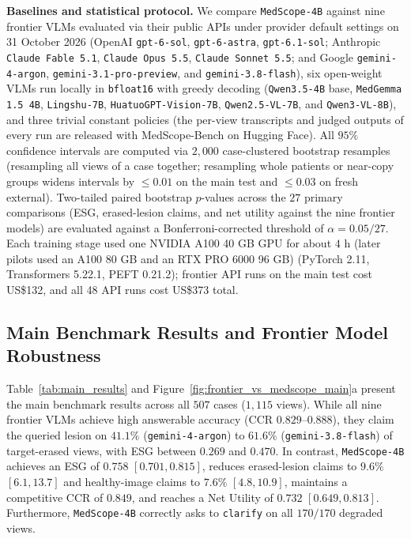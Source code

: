 \documentclass[5p,times,twocolumn,authoryear]{elsarticle}
\begin{document}
\textbf{Baselines and statistical protocol.} We compare \texttt{MedScope-4B} against nine frontier VLMs evaluated via their public APIs under provider default settings on 31 October 2026 (OpenAI \texttt{gpt-6-sol}, \texttt{gpt-6-astra}, \texttt{gpt-6.1-sol}; Anthropic \texttt{Claude Fable 5.1}, \texttt{Claude Opus 5.5}, \texttt{Claude Sonnet 5.5}; and Google \texttt{gemini-4-argon}, \texttt{gemini-3.1-pro-preview}, and \texttt{gemini-3.8-flash}), six open-weight VLMs run locally in \texttt{bfloat16} with greedy decoding (\texttt{Qwen3.5-4B} base, \texttt{MedGemma 1.5 4B}, \texttt{Lingshu-7B}, \texttt{HuatuoGPT-Vision-7B}, \texttt{Qwen2.5-VL-7B}, and \texttt{Qwen3-VL-8B}), and three trivial constant policies (the per-view transcripts and judged outputs of every run are released with MedScope-Bench on Hugging Face). All $95\%$ confidence intervals are computed via $2,000$ case-clustered bootstrap resamples (resampling all views of a case together; resampling whole patients or near-copy groups widens intervals by $\le 0.01$ on the main test and $\le 0.03$ on fresh external). Two-tailed paired bootstrap $p$-values across the $27$ primary comparisons (ESG, erased-lesion claims, and net utility against the nine frontier models) are evaluated against a Bonferroni-corrected threshold of $\alpha = 0.05/27$. Each training stage used one NVIDIA A100 40 GB GPU for about $4\text{ h}$ (later pilots used an A100 80 GB and an RTX PRO 6000 96 GB) (PyTorch 2.11, Transformers 5.22.1, PEFT 0.21.2); frontier API runs on the main test cost US\$132, and all 48 API runs cost US\$373 total.

\subsection{Main Benchmark Results and Frontier Model Robustness}
\label{subsec:exp_main}
Table~\ref{tab:main_results} and Figure~\ref{fig:frontier_vs_medscope_main}a present the main benchmark results across all $507$ cases ($1,115$ views). While all nine frontier VLMs achieve high answerable accuracy ($\text{CCR } 0.829\text{--}0.888$), they claim the queried lesion on $41.1\%$ (\texttt{gemini-4-argon}) to $61.6\%$ (\texttt{gemini-3.8-flash}) of target-erased views, with ESG between $0.269$ and $0.470$. In contrast, \texttt{MedScope-4B} achieves an ESG of $0.758$ $[0.701, 0.815]$, reduces erased-lesion claims to $9.6\%$ $[6.1, 13.7]$ and healthy-image claims to $7.6\%$ $[4.8, 10.9]$, maintains a competitive CCR of $0.849$, and reaches a Net Utility of $0.732$ $[0.649, 0.813]$. Furthermore, \texttt{MedScope-4B} correctly asks to \texttt{clarify} on all $170/170$ degraded views.
\end{document}
